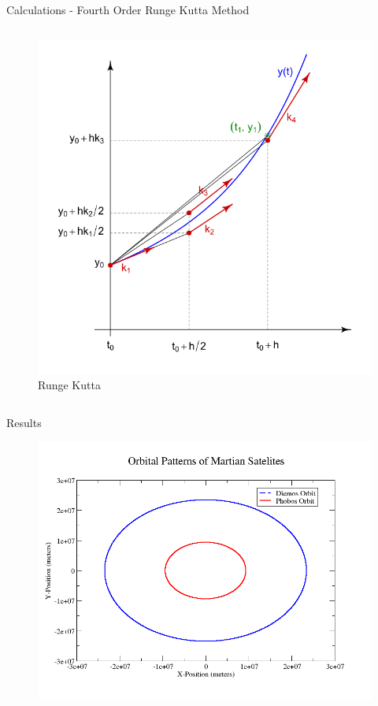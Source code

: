 \documentclass{beamer}	%
\begin{document}
\begin{frame}{Calculations - Fourth Order Runge Kutta Method}
\begin{columns}
\begin{column}{0.50\textwidth}
\begin{figure}
\label{fig:3}
\caption{Runge Kutta}
\includegraphics[scale=0.35]{../images/runge-kutta}
\end{figure}
 \end{column}
\end{columns}

\end{frame}

\begin{frame}{Results}
\begin{figure}
\label{fig:4}
\includegraphics[scale=0.35]{../images/orbits}
\end{figure}
\end{frame}
\end{document}
